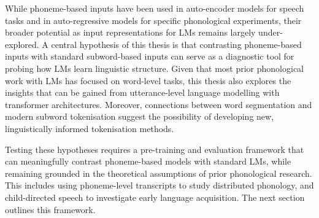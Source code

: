 While phoneme-based inputs have been used in auto-encoder models for speech tasks and in auto-regressive models for specific phonological experiments, their broader potential as input representations for LMs remains largely under-explored. A central hypothesis of this thesis is that contrasting phoneme-based inputs with standard subword-based inputs can serve as a diagnostic tool for probing how LMs learn linguistic structure. Given that most prior phonological work with LMs has focused on word-level tasks, this thesis also explores the insights that can be gained from utterance-level language modelling with transformer architectures. Moreover, connections between word segmentation and modern subword tokenisation suggest the possibility of developing new, linguistically informed tokenisation methods.

Testing these hypotheses requires a pre-training and evaluation framework that can meaningfully contrast phoneme-based models with standard LMs, while remaining grounded in the theoretical assumptions of prior phonological research. This includes using phoneme-level transcripts to study distributed phonology, and child-directed speech to investigate early language acquisition. The next section outlines this framework.




